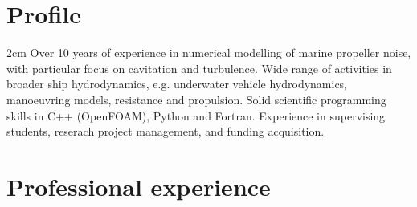 \documentclass[a4paper,10pt]{article}
\begin{document}
\pagestyle{empty} %

\par{\par\par}

\section{Profile}

\hspace{1cm}
\begin{minipage}{\textwidth}
\begin{adjustwidth}{}{2cm} %
	Over 10 years of experience in numerical modelling of marine propeller noise, with particular focus on cavitation and turbulence. Wide range of activities in broader ship hydrodynamics, e.g. underwater vehicle hydrodynamics, manoeuvring models, resistance and propulsion. Solid scientific programming skills in C++ (OpenFOAM), Python and Fortran. Experience in supervising students, reserach project management, and funding acquisition.
\end{adjustwidth}
\end{minipage}


\section{Professional experience}
\end{document}
